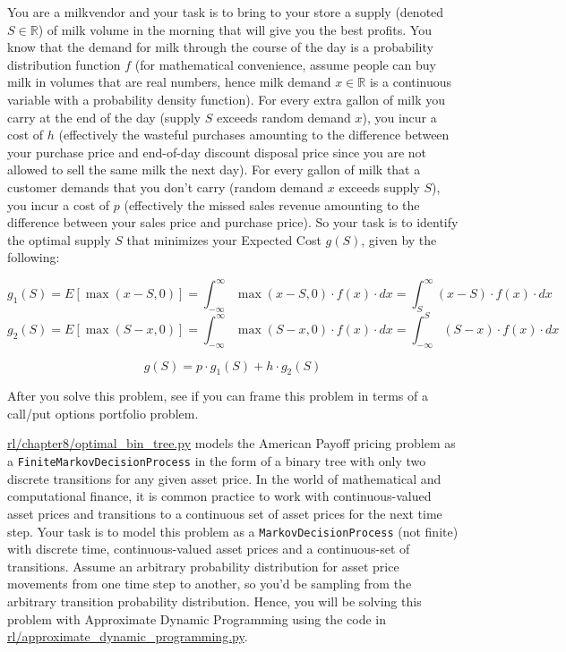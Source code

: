\documentclass[12pt]{exam}
\begin{document}
\begin{questions}
\question You are a milkvendor and your task is to bring to your store a supply (denoted $S \in \mathbb{R}$) of milk volume in the morning that will give you the best profits. You know that the demand for milk through the course of the day is a probability distribution function $f$ (for mathematical convenience, assume people can buy milk in volumes that are real numbers, hence milk demand $x \in \mathbb{R}$ is a continuous variable with a probability density function). For every extra gallon of milk you carry at the end of the day (supply $S$ exceeds random demand $x$), you incur a cost of $h$ (effectively the wasteful purchases amounting to the difference between your purchase price and end-of-day discount disposal price since you are not allowed to sell the same milk the next day). For every gallon of milk that a customer demands that you don't carry (random demand $x$ exceeds supply $S$), you incur a cost of $p$ (effectively the missed sales revenue amounting to the difference between your sales price and purchase price). So your task is to identify the optimal supply $S$ that minimizes your Expected Cost $g(S)$, given by the following:

$$g_1(S) = E[\max(x-S, 0)] = \int_{-\infty}^{\infty} \max(x-S, 0) \cdot f(x) \cdot dx = \int_S^{\infty} (x-S) \cdot f(x) \cdot dx$$
$$g_2(S) = E[\max(S-x, 0)] = \int_{-\infty}^{\infty} \max(S-x, 0) \cdot f(x) \cdot dx = \int_{-\infty}^S (S-x) \cdot f(x) \cdot dx$$

$$g(S) = p \cdot g_1(S) + h \cdot g_2(S)$$

After you solve this problem, see if you can frame this problem in terms of a call/put options portfolio problem.

 \href{https://github.com/TikhonJelvis/RL-book/blob/master/rl/chapter8/optimal_exercise_bin_tree.py}{rl\//chapter8\//optimal\_bin\_tree.py} models the American Payoff pricing problem as a \lstinline{FiniteMarkovDecisionProcess} in the form of a binary tree with only two discrete transitions for any given asset price. In the world of mathematical and computational finance, it is common practice to work with continuous-valued asset prices and transitions to a continuous set of asset prices for the next time step. Your task is to model this problem as a \lstinline{MarkovDecisionProcess} (not finite) with discrete time, continuous-valued asset prices and a continuous-set of transitions. Assume an arbitrary probability distribution for asset price movements from one time step to another, so you'd be sampling from the arbitrary transition probability distribution. Hence, you will be solving this problem with Approximate Dynamic Programming using the code in \href{https://github.com/TikhonJelvis/RL-book/blob/master/rl/approximate_dynamic_programming.py}{rl\//approximate\_dynamic\_programming.py}.


\end{questions}
\end{document}
